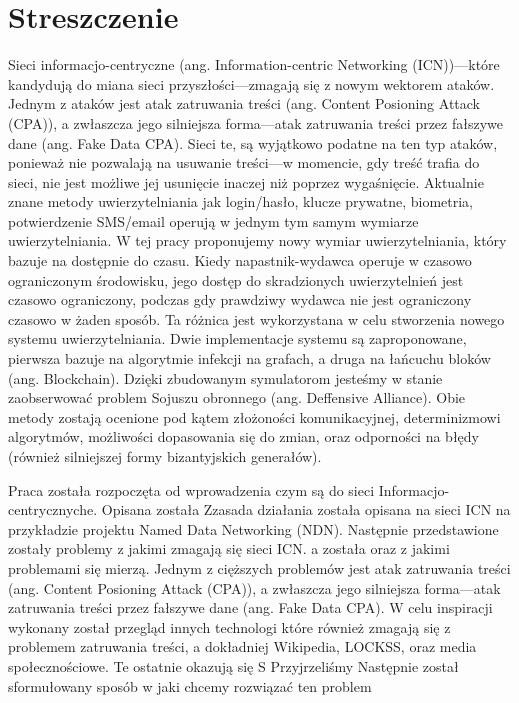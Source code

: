 \chapter*{Streszczenie}
Sieci informacjo-centryczne (ang. Information-centric Networking (ICN))––które kandydują do miana sieci przyszłości––zmagają się z nowym wektorem ataków. Jednym z ataków jest atak zatruwania treści (ang. Content Posioning Attack (CPA)), a zwłaszcza jego silniejsza forma––atak zatruwania treści przez fałszywe dane (ang. Fake Data CPA). Sieci te, są wyjątkowo podatne na ten typ ataków, ponieważ nie pozwalają na usuwanie treści––w momencie, gdy treść trafia do sieci, nie jest możliwe jej usunięcie inaczej niż poprzez wygaśnięcie.
Aktualnie znane metody uwierzytelniania jak login/hasło, klucze prywatne, biometria, potwierdzenie SMS/email operują w jednym tym samym wymiarze uwierzytelniania. W tej pracy proponujemy nowy wymiar uwierzytelniania, który bazuje na dostępnie do czasu. Kiedy napastnik-wydawca operuje w czasowo ograniczonym środowisku, jego dostęp do skradzionych uwierzytelnień jest czasowo ograniczony, podczas gdy prawdziwy wydawca nie jest ograniczony czasowo w żaden sposób. Ta różnica jest wykorzystana w celu stworzenia nowego systemu uwierzytelniania.
Dwie implementacje systemu są zaproponowane, pierwsza bazuje na algorytmie infekcji na grafach, a druga na łańcuchu bloków (ang. Blockchain). Dzięki zbudowanym symulatorom jesteśmy w stanie zaobserwować problem Sojuszu obronnego (ang. Deffensive Alliance).
Obie metody zostają ocenione pod kątem złożoności komunikacyjnej, determinizmowi algorytmów, możliwości dopasowania się do zmian, oraz odporności na błędy (również silniejszej formy bizantyjskich generałów).





Praca została rozpoczęta od wprowadzenia czym są do sieci Informacjo-centrycznyche. Opisana została Zzasada działania została opisana na sieci ICN na przykładzie projektu Named Data Networking (NDN). Następnie przedstawione zostały problemy z jakimi zmagają się sieci ICN. a została oraz z jakimi problemami się mierzą.
Jednym z cięższych problemów jest atak zatruwania treści (ang. Content Posioning Attack (CPA)), a zwłaszcza jego silniejsza forma––atak zatruwania treści przez fałszywe dane (ang. Fake Data CPA). W celu inspiracji wykonany został przegląd innych technologi które również zmagają się z problemem zatruwania treści, a dokładniej Wikipedia, LOCKSS, oraz media społecznościowe. Te ostatnie okazują się 
S
Przyjrzeliśmy 
Następnie został sformułowany sposób w jaki chcemy rozwiązać ten problem

